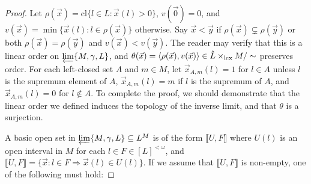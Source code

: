 \documentclass[11pt]{article}
\renewcommand{\cl}{\textrm{cl}}
\newcommand{\lexTimes}{\times_{\textrm{lex}}}
\newcommand{\vect}{\vec}
\newcommand{\lb}{\llbracket}
\newcommand{\rb}{\rrbracket}
\begin{document}
  \begin{proof}
    Let \(\rho(\vect x)=\cl\{l\in L:\vect x(l)>0\}\), \(v(\vect 0)=0\),
    and \(v(\vect x)=\min\{\vect x(l):l\in\rho(\vect x)\}\) otherwise.
    Say \(\vect x<\vect y\) if \(\rho(\vect x)\subsetneq\rho(\vect y)\)
    or both \(\rho(\vect x)=\rho(\vect y)\) and \(v(\vect x)<v(\vect y)\).
    The reader may verify that this is a linear order on
    \(\varprojlim\{M,\gamma,L\}\), and
    \(\theta(\vect x)=\<\rho(\vect x),v(\vect x)\>\in\hat L\lexTimes M/\sim\)
    preserves order.
    For each left-closed set \(A\) and \(m\in M\),
    let \(\vect x_{A,m}(l)=1\) for \(l\in A\) unless \(l\) is the supremum
    element of \(A\),
    \(\vect x_{A,m}(l)=m\) if \(l\) is the supremum of \(A\),
    and \(\vect x_{A,m}(l)=0\) for \(l\not\in A\).
    To complete the proof, we should demonstrate that the linear order we
    defined induces the topology of the inverse limit, and that \(\theta\)
    is a surjection.

    A basic open set in \(\varprojlim\{M,\gamma,L\}\subseteq L^M\)
    is of the form
    \(\lb U,F \rb\) where \(U(l)\) is an open interval in \(M\) for each
    \(l\in F\in [L]^{<\omega}\), and
    \(\lb U,F\rb=\{\vect x:l\in F\Rightarrow\vect x(l)\in U(l)\}\).
    If we assume that \(\lb U,F \rb\) is non-empty, one of the following
    must hold:


\end{proof}
\end{document}
